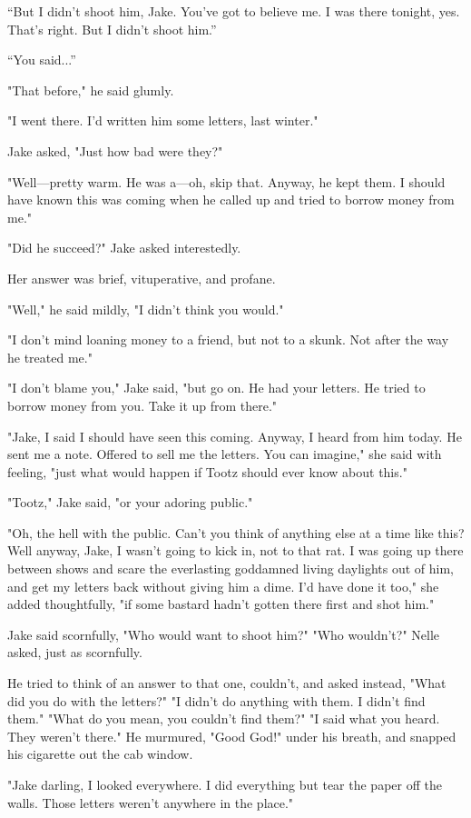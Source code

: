 \documentclass{novel}
\begin{document}
“But I didn’t shoot him, Jake. You’ve got to believe me. I was there tonight, yes. That’s right. But I didn’t shoot him.”

“You said...”

"That before," he said glumly.

"I went there. I'd written him some letters, last winter."

Jake asked, "Just how bad were they?"

"Well—pretty warm. He was a—oh, skip that. Anyway, he kept them. I should have known this was coming when he called up and tried to borrow money from me."

"Did he succeed?" Jake asked interestedly.

Her answer was brief, vituperative, and profane.

"Well," he said mildly, "I didn't think you would."

"I don't mind loaning money to a friend, but not to a skunk. Not after the way he treated me."

"I don't blame you," Jake said, "but go on. He had your letters. He tried to borrow money from you. Take it up from there."

"Jake, I said I should have seen this coming. Anyway, I heard from him today. He sent me a note. Offered to sell me the letters. You can imagine," she said with feeling, "just what would happen if Tootz should ever know about this."

"Tootz," Jake said, "or your adoring public."

"Oh, the hell with the public. Can't you think of anything else at a time like this? Well anyway, Jake, I wasn't going to kick in, not to that rat. I was going up there between shows and scare the everlasting goddamned living daylights out of him, and get my letters back without giving him a dime. I'd have done it too," she added thoughtfully, "if some bastard hadn't gotten there first and shot him."

Jake said scornfully, "Who would want to shoot him?" "Who wouldn't?" Nelle asked, just as scornfully.

He tried to think of an answer to that one, couldn't, and asked instead, "What did you do with the letters?" "I didn't do anything with them. I didn't find them." "What do you mean, you couldn't find them?" "I said what you heard. They weren't there." He murmured, "Good God!" under his breath, and snapped his cigarette out the cab window.

"Jake darling, I looked everywhere. I did everything but tear the paper off the walls. Those letters weren't anywhere in the place."
\end{document}
